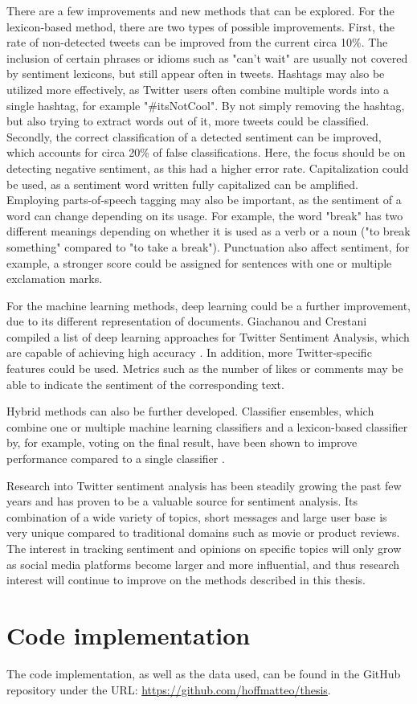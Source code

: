 There are a few improvements and new methods that can be explored. For the lexicon-based method, there are two types of possible improvements. First, the rate of non-detected tweets can be improved from the current circa 10\%. The inclusion of certain phrases or idioms such as "can't wait" are usually not covered by sentiment lexicons, but still appear often in tweets. Hashtags may also be utilized more effectively, as Twitter users often combine multiple words into a single hashtag, for example "\#itsNotCool". By not simply removing the hashtag, but also trying to extract words out of it, more tweets could be classified. Secondly, the correct classification of a detected sentiment can be improved, which accounts for circa 20\% of false classifications. Here, the focus should be on detecting negative sentiment, as this had a higher error rate. Capitalization could be used, as a sentiment word written fully capitalized can be amplified. Employing parts-of-speech tagging may also be important, as the sentiment of a word can change depending on its usage. For example, the word "break" has two different meanings depending on whether it is used as a verb or a noun ("to break something" compared to "to take a break"). Punctuation also affect sentiment, for example, a stronger score could be assigned for sentences with one or multiple exclamation marks.


For the machine learning methods, deep learning could be a further improvement, due to its different representation of documents. Giachanou and Crestani compiled a list of deep learning approaches for Twitter Sentiment Analysis, which are capable of achieving high accuracy \cite{DBLP:journals/csur/GiachanouC16}. In addition, more Twitter-specific features could be used. Metrics such as the number of likes or comments may be able to indicate the sentiment of the corresponding text.

Hybrid methods can also be further developed. Classifier ensembles, which combine one or multiple machine learning classifiers and a lexicon-based classifier by, for example, voting on the final result, have been shown to improve performance compared to a single classifier \cite{DBLP:journals/csur/GiachanouC16}.

Research into Twitter sentiment analysis has been steadily growing the past few years and has proven to be a valuable source for sentiment analysis. Its combination of a wide variety of topics, short messages and large user base is very unique compared to traditional domains such as movie or product reviews. The interest in tracking sentiment and opinions on specific topics will only grow as social media platforms become larger and more influential, and thus research interest will continue to improve on the methods described in this thesis.

\chapter{Code implementation}

The code implementation, as well as the data used, can be found in the GitHub repository under the URL: \url{https://github.com/hoffmatteo/thesis}.
